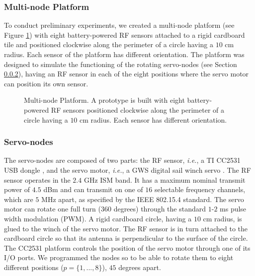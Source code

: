 \documentclass[conference]{IEEEtran}
\begin{document}
\subsubsection{Multi-node Platform}
\label{sec:multi_node_platform}

To conduct preliminary experiments, we created a multi-node platform (see Figure \ref{fig:cardboard_nodes}) with eight battery-powered RF sensors attached to a rigid cardboard tile and positioned clockwise along the perimeter of a circle having a $10$ cm radius. Each sensor of the platform has different orientation. The platform was designed to simulate the functioning of the rotating servo-nodes (see Section \ref{sec:servo_nodes}), having an RF sensor in each of the eight positions where the servo motor can position its own sensor.

\begin{figure}[t]
    \begin{center}
        \caption{Multi-node Platform. A prototype is built with eight battery-powered RF sensors positioned clockwise along the perimeter of a circle having a $10$ cm radius. Each sensor has different orientation.}
        \label{fig:cardboard_nodes}
    \end{center}
\end{figure}

\subsubsection{Servo-nodes}
\label{sec:servo_nodes}

The servo-nodes are composed of two parts: the RF sensor, \emph{i.e.}, a TI CC2531 USB dongle \cite{tidongle}, and the servo motor, \emph{i.e.}, a GWS digital sail winch servo \cite{GWS125_servo}. The RF sensor operates in the $2.4$ GHz ISM band. It has a maximum nominal transmit power of $4.5$ dBm and can transmit on one of $16$ selectable frequency channels, which are $5$ MHz apart, as specified by the IEEE 802.15.4 standard. The servo motor can rotate one full turn ($360$ degrees) through the standard $1$-$2$ ms pulse width modulation (PWM). A rigid cardboard circle, having a $10$ cm radius, is glued to the winch of the servo motor. The RF sensor is in turn attached to the cardboard circle so that its antenna is perpendicular to the surface of the circle. The CC2531 platform controls the position of the servo motor through one of its I/O ports. We programmed the nodes so to be able to rotate them to eight different positions ($p = \{1,...,8\}$), $45$ degrees apart.
\end{document}
